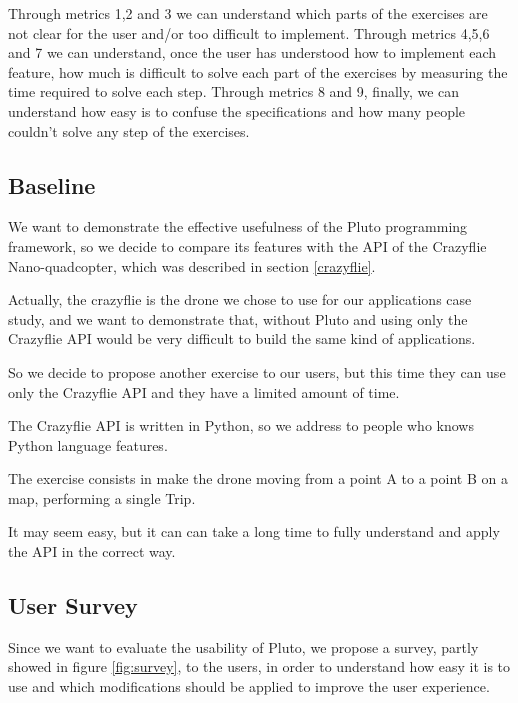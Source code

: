 Through metrics 1,2 and 3 we can understand which parts of the exercises are not clear for the user and/or too difficult to implement. 
Through metrics 4,5,6 and 7 we can understand, once the user has understood how to implement each feature, how much is difficult to solve each part of the exercises by measuring the time required to solve each step.
Through metrics 8 and 9, finally, we can understand how easy is to confuse the specifications and how many people couldn't solve any step of the exercises.


\subsection{Baseline}

We want to demonstrate the effective usefulness of the Pluto programming framework, so we decide to compare its features with the API of the Crazyflie Nano-quadcopter, which was described in section \ref{crazyflie}.

Actually, the crazyflie is the drone we chose to use for our applications case study, and we want to demonstrate that, without Pluto and using only the Crazyflie API would be very difficult to build the same kind of applications.

So we decide to propose another exercise to our users, but this time they can use only the Crazyflie API and they have a limited amount of time.

The Crazyflie API is written in Python, so we address to people who knows Python language features.

The exercise consists in make the drone moving from a point A to a point B on a map, performing a single Trip.

It may seem easy, but it can can take a long time to fully understand and apply the API in the correct way.


\subsection{User Survey}\label{survey}

Since we want to evaluate the usability of Pluto, we propose a survey, partly showed in figure \ref{fig:survey}, to the users, in order to understand how easy it is to use and which modifications should be applied to improve the user experience.

